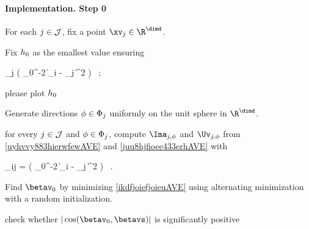 \paragraph{Implementation. Step 0}
\begin{mylist}
\item
For each \( j \in \mathcal{J} \),
fix a point \( \xv_{j} \in \R^{\dimd} \).

\item
Fix \( h_{0} \) as the smallest value ensuring
\begin{EQA}[c]
	 \sum_{j \in \JJJ} 
	\sumi \Kern\bigl( \hiso_{0}^{-2} \| \Xv_{i} - \xv_{j} \|^{2} \bigr)
	\geq 
	\nmin
	\, ;
\end{EQA}

{\color{blue} please plot \( h_{0} \)}

\item
Generate directions \( \phi \in \Phi_{j} \) uniformly on the unit sphere in \( \R^{\dimd} \).

\item 
for every \( j \in \mathcal{J} \) and \( \phi \in \Phi_{j} \), compute \( \Ima_{j,\sph} \) and \( \Uv_{j,\sph} \) from 
\eqref{uyhvvy883hierwfewAVE} and \eqref{juu8hjfioee433erhAVE} 
with 
\begin{EQA}[c]
	\weight_{ij} = \Kern\bigl( \hiso_{0}^{-2} \| \Xv_{i} - \xv_{j} \|^{2} \bigr) 
	\, .
\end{EQA}
\item 
Find \( \betav_{0} \) by minimizing \eqref{ikdfjoiefjoieuAVE} using alternating minimization
with a random initialization.
\end{mylist}

{\color{blue} check whether \( |\cos(\betav_{0},\betavs)| \) is significantly positive}

